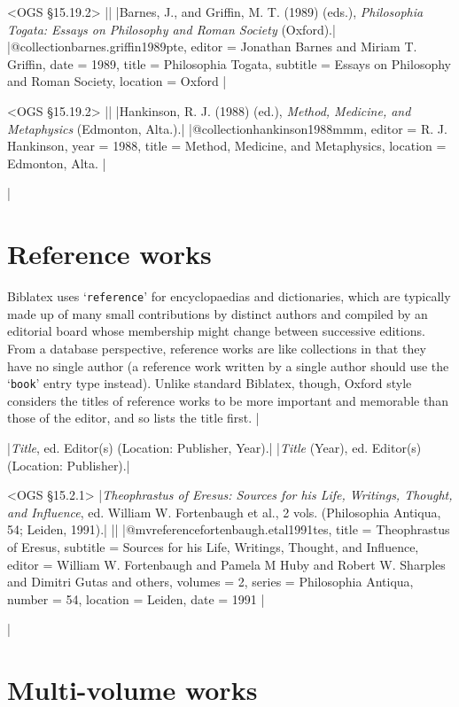 \documentclass[extrafontsizes,11pt,a4paper,oneside]{memoir}
\newcommand*{\lit}[1]{\textsf{#1}}
\newcommand*{\code}[1]{`\texttt{#1}'}
\begin{document}
\bibexample<OGS \S15.19.2>
||%
|Barnes, J., and Griffin, M. T. (1989) (eds.), \emph{Philosophia Togata: Essays on Philosophy and Roman Society} (Oxford).|%
|@collection{barnes.griffin1989pte,
  editor = {Jonathan Barnes and Miriam T. Griffin},
  date = {1989},
  title = {Philosophia Togata},
  subtitle = {Essays on Philosophy and Roman Society},
  location = {Oxford}
}|%

\bibexample<OGS \S15.19.2>
||%
|Hankinson, R. J. (1988) (ed.), \emph{Method, Medicine, and Metaphysics} (Edmonton, Alta.).|%
|@collection{hankinson1988mmm,
  editor = {R. J. Hankinson},
  year = {1988},
  title = {Method, Medicine, and Metaphysics},
  location = {Edmonton, Alta.}
}|

\todoc|
\section{Reference works}

Biblatex uses \code{reference} for encyclopaedias and dictionaries, which are typically made up of many small contributions by distinct authors and compiled by an editorial board whose membership might change between successive editions. From a database perspective, reference works are like collections in that they have no single author (a reference work written by a single author should use the \code{book} entry type instead). Unlike standard Biblatex, though, Oxford style considers the titles of reference works to be more important and memorable than those of the editor, and so lists the title first.
|

\specs
|\emph{Title}, \lit{ed.} Editor(s) (Location: Publisher, Year).|%
|\emph{Title} (Year), \lit{ed.} Editor(s) (Location: Publisher).|

\bibexample<OGS \S15.2.1>
|\emph{Theophrastus of Eresus: Sources for his Life, Writings, Thought, and Influence}, ed. William W. Fortenbaugh et al., 2 vols. (Philosophia Antiqua, 54; Leiden, 1991).|%
||%
|@mvreference{fortenbaugh.etal1991tes,
  title = {{Theophrastus} of {Eresus}},
  subtitle = {Sources for his Life, Writings, Thought, and Influence},
  editor = {William W. Fortenbaugh and Pamela M Huby and Robert W. Sharples and Dimitri Gutas and others},
  volumes = {2},
  series = {Philosophia Antiqua},
  number = {54},
  location = {Leiden},
  date = {1991}
}|

\todoc|
\section{Multi-volume works}
\end{document}
